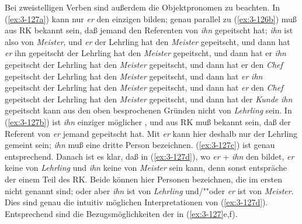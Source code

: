 \documentclass[output=paper]{langsci/langscibook}
\begin{document}
Bei zweistelligen Verben sind außerdem die Objektpronomen zu beachten. In (\ref{ex:3-127a}) kann nur \textit{er} den einzigen  bilden; genau
parallel zu (\ref{ex:3-126b}) muß aus RK bekannt sein, daß jemand den Referenten von \textit{ihn} gepeitscht hat; \textit{ihn} ist also  von
\textit{Meister}, und \textit{er}
\eal
\label{ex:3-127}
\ex
\label{ex:3-127a}
der Lehrling hat den \textit{Meister} gepeitscht, und dann hat \textit{er} ihn gepeitscht
\ex
\label{ex:3-127b}
der Lehrling hat den \textit{Meister} gepeitscht, und dann hat er \textit{ihn} gepeitscht
\ex
\label{ex:3-127c}
der Lehrling hat den \textit{Meister} gepeitscht, und dann hat er den \textit{Chef} gepeitscht
\ex
\label{ex:3-127d}
der Lehrling hat den \textit{Meister} gepeitscht, und dann hat \textit{er} \textit{ihn} gepeitscht
\ex
\label{ex:3-127e}
der Lehrling hat den \textit{Meister} gepeitscht, und dann hat \textit{er} den \textit{Chef} gepeitscht
\ex
\label{ex:3-127f}
der Lehrling hat den \textit{Meister} gepeitscht, und dann hat der \textit{Kunde} \textit{ihn} gepeitscht
\zl
kann aus den oben besprochenen Gründen nicht  von
\textit{Lehrling} sein. In (\ref{ex:3-127b}) ist \textit{ihn} einziger möglicher
, und aus RK muß bekannt sein, daß der Referent von \textit{er} jemand gepeitscht hat. Mit \textit{er} kann hier deshalb nur der Lehrling gemeint sein; \textit{ihn} muß eine dritte Person bezeichnen. (\ref{ex:3-127c}) ist genau entsprechend. Danach ist es klar, daß in (\ref{ex:3-127d}), wo \textit{er} + \textit{ihn} den  bildet, \textit{er} keine 
von \textit{Lehrling} und \textit{ihn} keine  von \textit{Meister} sein kann, denn sonst entspräche der  einem Teil des RK. Beide  können hier Personen bezeichnen, die im ersten  nicht genannt sind; oder aber \textit{ihn} ist  von \textit{Lehrling} und/""oder \textit{er} ist  von \textit{Meister}. Dies sind genau die intuitiv möglichen Interpretationen von (\ref{ex:3-127d}). Entsprechend sind die
Bezugsmöglichkeiten der  in (\ref{ex:3-127}e,f).
\end{document}

